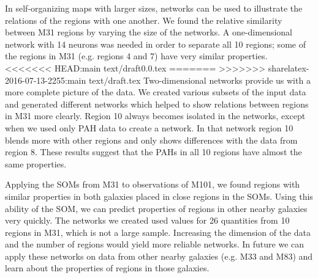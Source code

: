\documentclass[useAMS,usenatbib]{mn2e}
\begin{document}
In self-organizing maps with larger sizes, networks can be used to illustrate the relations of the regions with one another.
We found the relative similarity between M31 regions by varying the size of the networks.
A one-dimensional network with 14 neurons was needed in order to
separate all 10 regions; some of the regions in M31 (e.g. regions 4 and 7) have very similar properties.
<<<<<<< HEAD:main text/draft0.0.tex
=======
>>>>>>> sharelatex-2016-07-13-2255:main text/draft.tex
Two-dimensional networks provide us with a more complete picture of the data.
We created various subsets of the input data and generated different networks which helped to show relations between regions in M31 more clearly.
Region 10 always becomes isolated in the networks, except when we  used only PAH data to create a network. %
In that network region 10 blends more with other regions and only shows differences with the data from region 8.
These results suggest that the PAHs in all 10 regions have almost the same properties.

Applying the SOMs from M31 to observations of M101, we found regions with similar properties in both galaxies placed in close regions in the SOMs.
Using this ability of the SOM, we can predict properties of regions in other nearby galaxies very quickly.
The networks we created used values for 26 quantities from 10 regions in M31, which is not a large sample.
Increasing the dimension of the data and the number of regions would yield more reliable networks.
In future we can apply these networks on data from other nearby galaxies (e.g. M33 and M83) and learn about the properties of regions in those galaxies.

 
\end{document}
